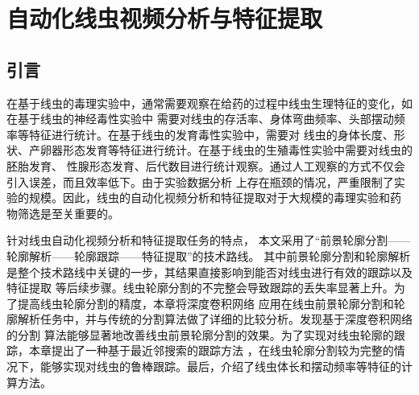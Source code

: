 \chapter{自动化线虫视频分析与特征提取}
\section{引言}
	在基于线虫的毒理实验中，通常需要观察在给药的过程中线虫生理特征的变化，如在基于线虫的神经毒性实验中
	需要对线虫的存活率、身体弯曲频率、头部摆动频率等特征进行统计。在基于线虫的发育毒性实验中，需要对
	线虫的身体长度、形状、产卵器形态发育等特征进行统计。在基于线虫的生殖毒性实验中需要对线虫的胚胎发育、
	性腺形态发育、后代数目进行统计观察。通过人工观察的方式不仅会引入误差，而且效率低下。由于实验数据分析
	上存在瓶颈的情况，严重限制了实验的规模。因此，线虫的自动化视频分析和特征提取对于大规模的毒理实验和药
	物筛选是至关重要的。
	
	针对线虫自动化视频分析和特征提取任务的特点，
	本文采用了“前景轮廓分割——轮廓解析——轮廓跟踪——特征提取”的技术路线。
	其中前景轮廓分割和轮廓解析是整个技术路线中关键的一步，其结果直接影响到能否对线虫进行有效的跟踪以及特征提取
	等后续步骤。线虫轮廓分割的不完整会导致跟踪的丢失率显著上升。为了提高线虫轮廓分割的精度，本章将深度卷积网络
	应用在线虫前景轮廓分割和轮廓解析任务中，并与传统的分割算法做了详细的比较分析。发现基于深度卷积网络的分割
	算法能够显著地改善线虫前景轮廓分割的效果。为了实现对线虫轮廓的跟踪，本章提出了一种基于最近邻搜索的跟踪方法
	，在线虫轮廓分割较为完整的情况下，能够实现对线虫的鲁棒跟踪。最后，介绍了线虫体长和摆动频率等特征的计算方法。


